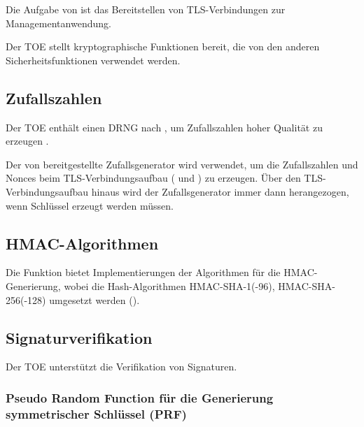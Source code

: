 %



Die Aufgabe von  ist das
Bereitstellen von TLS-Verbindungen zur Managementanwendung.

\sfbeschreibung{}

Der TOE stellt kryptographische Funktionen bereit, die von den anderen
Sicherheitsfunktionen verwendet werden.

\subsection{Zufallszahlen}%
\label{sf.cryptographicservices.rng}

Der TOE enthält einen DRNG nach , um
Zufallszahlen hoher Qualität zu erzeugen \autocite{SP80090A}.

Der von  bereitgestellte Zufallsgenerator wird
verwendet, um die Zufallszahlen und Nonces beim TLS-Verbindungsaufbau
( und ) zu erzeugen. Über den
TLS-Verbindungsaufbau hinaus wird der Zufallsgenerator immer dann herangezogen,
wenn Schlüssel erzeugt werden müssen.

\subsection{HMAC-Algorithmen}%
\label{sf.cryptographicservices.hmac}

Die Funktion bietet Implementierungen der Algorithmen für die
HMAC-Generierung, wobei die Hash-Algorithmen HMAC-SHA-1(-96),
HMAC-SHA-256(-128) umgesetzt werden ().

\subsection{Signaturverifikation}%
\label{sf.cryptographicservices.sigver}

Der TOE unterstützt die Verifikation von Signaturen.


\subsubsection{Pseudo Random Function für die Generierung
  symmetrischer Schlüssel (PRF)}%
\label{sf.cryptographicservices.ipsec.prf}

